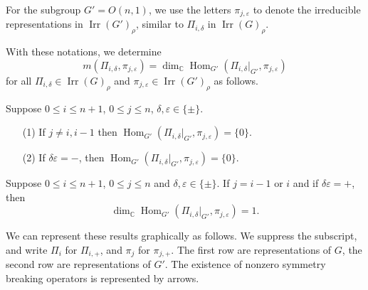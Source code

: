 For the subgroup $G'=O(n,1)$,
 we use the letters $\pi_{j,\varepsilon}$ to 
 denote the irreducible representations
 in ${\operatorname{Irr}}(G')_{\rho}$, 
 similar to $\Pi_{i,\delta}$
 in ${\operatorname{Irr}}(G)_{\rho}$.  



With these notations,
 we determine
\[
  m(\Pi_{i,\delta},\pi_{j,\varepsilon}) = \dim_{\mathbb{C}} {\operatorname{Hom}}_{G'}
  (\Pi_{i,\delta}|_{G'},\pi_{j,\varepsilon})
\]
for all $\Pi_{i,\delta} \in {\operatorname{Irr}}(G)_{\rho}$
 and $\pi_{j,\varepsilon} \in {\operatorname{Irr}}(G')_{\rho}$
 as follows.  
\begin{theorem}
\label{thm:introSBOvanish}
Suppose $0 \le i \le n+1$, $0 \le j \le n$, 
 $\delta, \varepsilon \in \{\pm\}$.  
\begin{enumerate}
\item[{\rm{(1)}}]
If $j \not = i, i-1$ then
$
  {\operatorname{Hom}}_{G'}(\Pi_{i,\delta}|_{G'}, \pi_{j,\varepsilon})=\{0\}. 
$

\item[{\rm{(2)}}] 
If $\delta \varepsilon =-$, 
 then 
$ 
{\operatorname{Hom}}_{G'}(\Pi_{i,\delta}|_{G'}, \pi_{j,\varepsilon}) =\{0\}.  
$ 
\end{enumerate}
\end{theorem}


\medskip
\noindent

\begin{theorem} 
\label{thm:introSBOone}
Suppose $0 \le i \le n+1$, $0 \le j \le n$
 and $\delta, \varepsilon \in \{\pm\}$.  
If $j=i-1$ or $i$
 and if $\delta \varepsilon =+$, 
 then 
\[
   \dim_{\mathbb{C}}
   {\operatorname{Hom}}_{G'}
   (\Pi_{i,\delta}|_{G'}, \pi_{j,\varepsilon}) =1.  
\]
\end{theorem}

\medskip

We can represent these results graphically as follows.  
We suppress the subscript, 
 and write $\Pi_i$ for $\Pi_{i,+}$, 
 and $\pi_j$ for $\pi_{j,+}$. 
 The first row are representations of $G$,
 the second row are representations of $G'$. 
The existence of nonzero symmetry breaking operators is represented by  arrows.


